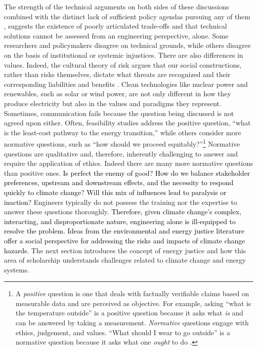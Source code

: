 The strength of the technical arguments on both sides of these discussions
combined with the distinct lack of sufficient policy agendas pursuing any of
them \cite{roelfsema_taking_2020,hale_assessing_2022}, suggests the existence of
poorly articulated trade-offs and that technical solutions cannot be assessed
from an engineering perspective, alone. Some researchers and policymakers
disagree on technical grounds, while others disagree on the basis of
institutional or systemic injustices. There are also differences in values.
Indeed, the cultural theory of risk argues that our social constructions, rather
than risks themselves, dictate what threats are recognized and their
corresponding liabilities and benefits \cite{mcneeley_cultural_2014,
van_de_graaff_understanding_2016}. Clean technologies like nuclear power and
renewables, such as solar or wind power, are not only different in how they
produce electricity but also in the values and paradigms they represent.
Sometimes, communication fails because the question being discussed is not
agreed upon either. Often, feasibility studies address the positive question,
``what is the least-cost pathway to the energy transition,'' while others
consider more normative questions, such as ``how should we proceed
equitably?''\footnote{ A \textit{positive} question is one that deals with
factually verifiable claims based on measurable data and are perceived as
objective. For example, asking ``what is the temperature outside'' is a positive
question because it asks what \textit{is} and can be answered by taking a
measurement. \textit{Normative} questions engage with ethics, judgement, and
values. ``What should I wear to go outside'' is a normative question because it
asks what one \textit{ought} to do \cite{hands_positive-normative_2012}.}
Normative questions are qualitative and, therefore, inherently challenging to
answer and require the application of ethics. Indeed there are many more
normative questions than positive ones. \textcolor{black}{Is perfect the enemy
of good? How do we balance stakeholder preferences, upstream and downstream
effects, and the necessity to respond quickly to climate change? Will this mix
of influences lead to paralysis or inaction?} Engineers typically do not possess
the training nor the expertise to answer these questions thoroughly.
\textcolor{black}{Therefore, given climate change's complex, interacting, and
disproportionate nature, engineering alone is ill-equipped to resolve the
problem. Ideas from the environmental and energy justice literature offer a
social perspective for addressing the risks and impacts of climate change
hazards.} The next section introduces the concept of energy justice and how this
area of scholarship understands challenges related to climate change and energy
systems.

